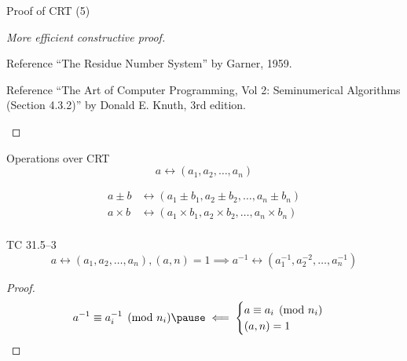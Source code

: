 \begin{frame}{Proof of CRT (5)}
  \begin{proof}[More efficient constructive proof]
	\begin{alertblock}{Reference}
	  ``The Residue Number System'' by Garner, 1959.
	\end{alertblock}

	\begin{alertblock}{Reference}
	  ``The Art of Computer Programming, Vol 2: Seminumerical Algorithms (Section 4.3.2)'' by Donald E. Knuth, 3rd edition.
	\end{alertblock}
  \end{proof}
\end{frame}
\begin{frame}{Operations over CRT}
  \[
	a \leftrightarrow (a_1, a_2, \ldots, a_n)
  \]

  \begin{align*}
	a \pm b &\leftrightarrow (a_1 \pm b_1, a_2 \pm b_2, \ldots, a_n \pm b_n) \\
	a \times b &\leftrightarrow (a_1 \times b_1, a_2 \times b_2, \ldots, a_n \times b_n) \\
  \end{align*}

  \pause
  \vspace{-0.30cm}

  \begin{exampleblock}{TC 31.5--3}
	\[
	 a \leftrightarrow (a_1, a_2, \ldots, a_n), (a,n) = 1 \implies a^{-1} \leftrightarrow (a_1^{-1}, a_2^{-2}, \ldots, a_n^{-1})
	\]
  \end{exampleblock}

  \pause
  \begin{proof}
	\begin{equation*}
	  a^{-1} \equiv a_i^{-1} \pmod{n_i} \pause \impliedby \begin{cases}
		a \equiv a_i \pmod{n_i} \\
		(a,n) = 1
	  \end{cases}
	\end{equation*}
  \end{proof}
\end{frame}
